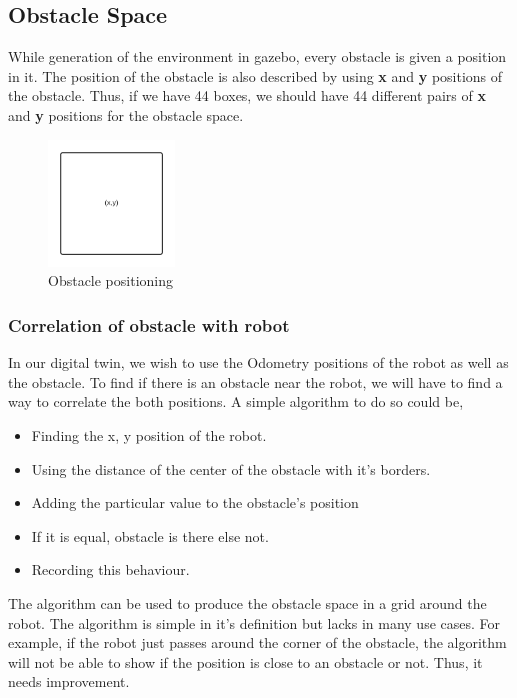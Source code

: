 \subsection{Obstacle Space}
While generation of the environment in gazebo, every obstacle is given a position in it. The position of the obstacle is also described by 
using \textbf{x} and \textbf{y} positions of the obstacle. Thus, if we have 44 boxes, we should have 44 different pairs of \textbf{x} and \textbf{y} positions for the obstacle space.
\begin{figure}[th]
    \centering
    \includegraphics[width=0.3\textwidth]{Figures/simple-obstacle-x-y.png}
    \decoRule
    \caption[]{Obstacle positioning}
    \label{fig:ObstaclePositioning}
\end{figure}

\subsubsection{Correlation of obstacle with robot}
In our digital twin, we wish to use the Odometry positions of the robot as well as the obstacle. To find if there is an obstacle near the robot, we will have to find a way to correlate the both positions.
A simple algorithm to do so could be,
\begin{itemize}
    \item Finding the x, y position of the robot.
    \item Using the distance of the center of the obstacle with it's borders.
    \item Adding the particular value to the obstacle's position
    \item If it is equal, obstacle is there else not.
    \item Recording this behaviour.
\end{itemize}

The algorithm can be used to produce the obstacle space in a grid around the robot. The algorithm is simple in it's definition but lacks in many use cases.
For example, if the robot just passes around the corner of the obstacle, the algorithm will not be able to show if the position is close to an obstacle or not.
Thus, it needs improvement. 

